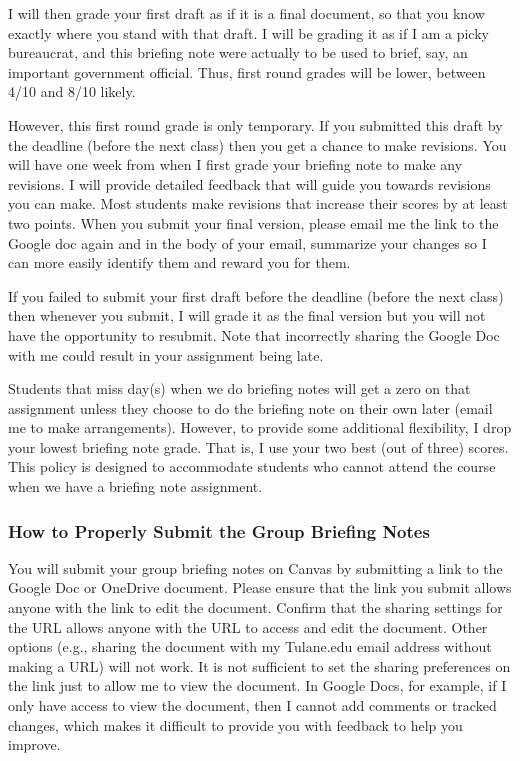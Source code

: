 \documentclass[11pt,letterpaper,final]{article}
\begin{document}
I will then grade your first draft as if it is a final document, so that you know exactly where you stand with that draft. I will be grading it as if I am a picky bureaucrat, and this briefing note were actually to be used to brief, say, an important government official. Thus, first round grades will be lower, between 4/10 and 8/10 likely. 

However, this first round grade is only temporary. If you submitted this draft by the deadline (before the next class) then you get a chance to make revisions. You will have one week from when I first grade your briefing note to make any revisions. I will provide detailed feedback that will guide you towards revisions you can make. Most students make revisions that increase their scores by at least two points. When you submit your final version, please email me the link to the Google doc again and in the body of your email, summarize your changes so I can more easily identify them and reward you for them. 

If you failed to submit your first draft before the deadline (before the next class) then whenever you submit, I will grade it as the final version but you will not have the opportunity to resubmit. Note that incorrectly sharing the Google Doc with me could result in your assignment being late.

Students that miss day(s) when we do briefing notes will get a zero on that assignment unless they choose to do the briefing note on their own later (email me to make arrangements). However, to provide some additional flexibility, I drop your lowest briefing note grade. That is, I use your two best (out of three) scores. This policy is designed to accommodate students who cannot attend the course when we have a briefing note assignment.

\subsubsection{How to Properly Submit the Group Briefing Notes}
You will submit your group briefing notes on Canvas by submitting a link to the Google Doc or OneDrive document. Please ensure that the link you submit allows anyone with the link to edit the document. Confirm that the sharing settings for the URL allows anyone with the URL to access and edit the document. Other options (e.g., sharing the document with my Tulane.edu email address without making a URL) will not work. It is not sufficient to set the sharing preferences on the link just to allow me to view the document. In Google Docs, for example, if I only have access to view the document, then I cannot add comments or tracked changes, which makes it difficult to provide you with feedback to help you improve. 
\end{document}
